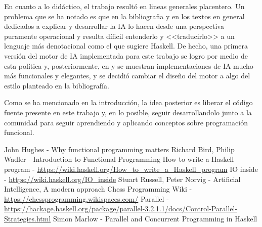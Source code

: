 \documentclass{llncs}
\begin{document}
En cuanto a lo didáctico, el trabajo resultó en lineas generales placentero. Un problema que se ha notado es que en la bibliografia y en los textos en general dedicados a explicar y desarrollar la IA lo hacen desde una perspectiva puramente operacional y resulta díficil entenderlo y <<traducirlo>> a un lenguaje más denotacional como el que sugiere Haskell. De hecho, una primera versión del motor de IA implementada para este trabajo se logro por medio de esta política y, posteriormente, en \cite{whyfunctional} y \cite{introfunctional} se muestran implementaciones de IA mucho más funcionales y elegantes, y se decidió cambiar el diseño del motor a algo del estilo planteado en la bibliografía.

Como se ha mencionado en la introducción, la idea posterior es liberar el código fuente presente en este trabajo y, en lo posible, seguir desarrollandolo junto a la comunidad para seguir aprendiendo y aplicando conceptos sobre programación funcional.

%
%
\begin{thebibliography}{}
  John Hughes - Why functional programming matters
  Richard Bird, Philip Wadler - Introduction to Functional Programming
    How to write a Haskell program - \url{https://wiki.haskell.org/How\_to\_write\_a\_Haskell\_program}
    IO inside - \url{https://wiki.haskell.org/IO\_inside}
    Stuart Russell, Peter Norvig - Artificial Intelligence, A modern approach
    Chess Programming Wiki - \url{https://chessprogramming.wikispaces.com/}
    Parallel - \url{https://hackage.haskell.org/package/parallel-3.2.1.1/docs/Control-Parallel-Strategies.html}
    Simon Marlow - Parallel and Concurrent Programming in Haskell
\end{thebibliography}
\end{document}
